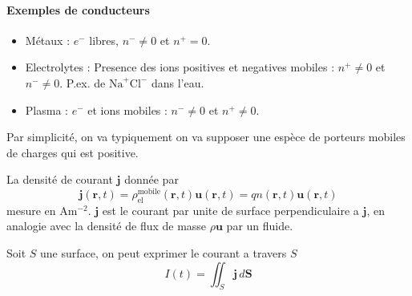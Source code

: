 \paragraph{Exemples de conducteurs}
\begin{itemize}
\item Métaux : $e^{-}$ libres, $n^{-}\neq 0$ et $n^{+}=0$.
\item Electrolytes : Presence des ions positives et negatives mobiles : $n^{+}\neq 0$ et $n^{-}\neq 0$. P.ex. de $\mathrm{Na}^{+}\mathrm{Cl}^{-}$ dans l'eau.
\item Plasma : $e^{-}$ et ions mobiles : $n^{-}\neq 0$ et $n^{+}\neq 0$.
\end{itemize}
\begin{remark}
Par simplicité, on va typiquement on va supposer une espèce de porteurs mobiles de charges qui est positive. 
\end{remark}
\begin{definition}
La densité de courant $\boldsymbol{j}$ donnée par
$$
\boldsymbol{j}(\boldsymbol{r},t)=\rho _{\mathrm{el}}^{\mathrm{mobile}}(\boldsymbol{r},t)\boldsymbol{u}(\boldsymbol{r},t)=qn(\boldsymbol{r},t)\boldsymbol{u}(\boldsymbol{r},t)
$$
mesure en $\mathrm{A}\mathrm{m}^{-2}$. $\boldsymbol{j}$ est le courant par unite de surface perpendiculaire a $\boldsymbol{j}$, en analogie avec la densité de flux de masse $\rho \boldsymbol{u}$ par un fluide.
\end{definition}

Soit $S$ une surface, on peut exprimer le courant a travers $S$ 
$$
I(t)=\iint _{S}\boldsymbol{j}\,d\boldsymbol{S}
$$

